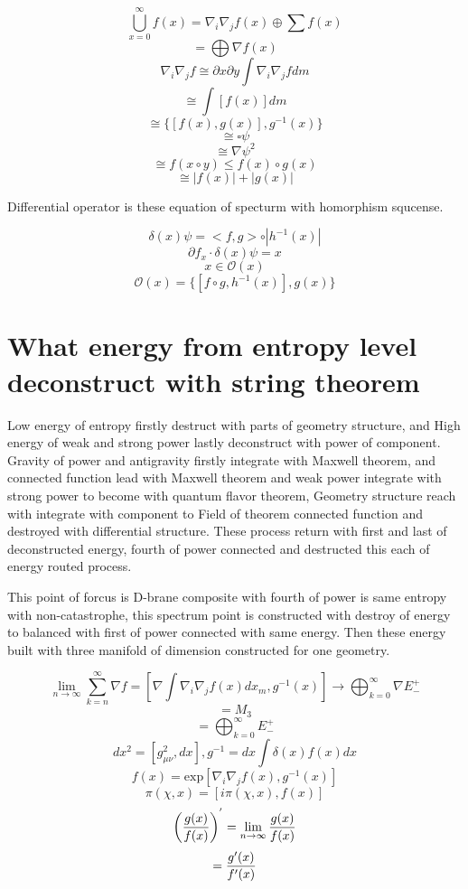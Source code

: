 \documentclass{jsarticle}
\begin{document}
$$ \bigcup_{x=0}^{\infty} f(x) = \nabla_{i}\nabla_{j}f(x) \oplus \sum f(x) $$
$$ = \bigoplus \nabla f(x) $$
$$ \nabla_{i}\nabla_{j} f \cong \partial x \partial y \int \nabla_{i}\nabla_{j} f dm $$
  $$ \cong \int [f(x)]dm $$
$$  \cong \{[f(x),g(x)],g^{-1}(x)\} $$
$$ \cong \square \psi  $$
$$ \cong \nabla \psi^2 $$
$$ \cong f(x \circ y) \le f(x) \circ g(x) $$ 
$$ \cong |f(x)| + |g(x)| $$

 Differential operator is these equation of specturm with homorphism squcense.

 $$ \delta (x) \psi = <f,g>\circ |h^{-1}(x)| $$
 $$ \partial f_x \cdot \delta (x) \psi = x $$
 $$ x \in \mathcal{O} (x) $$
 $$ \mathcal {O} (x) = \{[f \circ g, h^{-1}(x)], g(x) \} $$

 \section{What energy from entropy level deconstruct with string theorem}

 Low energy of entropy firstly destruct with parts of geometry structure, and High energy of weak and strong power
lastly deconstruct with power of component.
Gravity of power and antigravity firstly integrate with Maxwell theorem, and connected function lead with
Maxwell theorem and weak power integrate with strong power to become with quantum flavor theorem,
Geometry structure reach with integrate with component to Field of theorem connected function and destroyed with 
differential structure. These process return with first and last of deconstructed energy, fourth of power 
connected and destructed this each of energy routed process.

  This point of forcus is D-brane composite with fourth of power is same entropy with non-catastrophe,
this spectrum point is constructed with destroy of energy to balanced with first of power connected with same energy.
Then these energy built with three manifold of dimension constructed for one geometry.

  $$ \lim_{n \to \infty} \sum_{k=n}^{\infty} \nabla f = [\nabla \int 
 \nabla_{i}\nabla_{j} f(x) dx_m, g^{-1}(x)] \to \bigoplus_{k=0}^{\infty}  
 \nabla E^{+}_{-} $$
 $$ = M_{3} $$
 $$ = \bigoplus_{k=0}^{\infty} E^{+}_{-} $$
 $$ dx^2 = [g^2_{\mu\nu},dx], g^{-1} = dx \int \delta(x)f(x)dx $$ 
 $$ f(x) = \mathrm{exp}[\nabla_{i}\nabla_{j}f(x),g^{-1}(x)] $$
	 $$ \pi(\chi,x) = [i\pi (\chi,x), f(x)] $$ 
	 $$ \left({g(x) \over f(x)}\right)^{'} = \lim_{n \to \infty} {g(x) \over f(x)} $$
         $$  = {g'(x) \over f'(x)} $$
\end{document}
